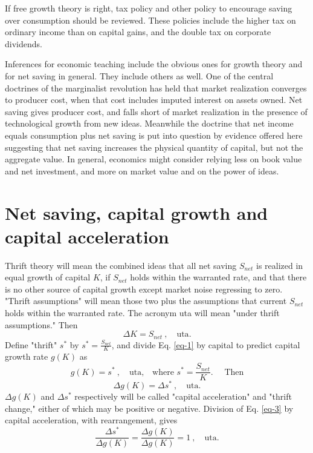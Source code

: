 \documentclass[a4paper,fleqn]{latex_styles/cas-sc}
\begin{document}
If free growth theory is right, tax policy and other policy to encourage
saving over consumption should be reviewed. These policies
include the higher tax on ordinary income than on capital gains, and the
double tax on corporate dividends.

Inferences for economic teaching include the obvious ones for growth
theory and for net saving in general. They include others as well.
One of the central doctrines of the marginalist revolution has held that
market realization converges to producer cost, when that cost includes
imputed interest on assets owned. Net saving gives producer cost,
and falls short of market realization in the presence of technological
growth from new ideas. Meanwhile the doctrine that net income equals
consumption plus net saving is put into question by evidence offered
here suggesting that net saving increases the physical quantity of
capital, but not the aggregate value. In general, economics might
consider relying less on book value and net investment, and more on market value and on the
power of ideas.

\hypertarget{net-saving-and-capital-growth}{%
\section{Net saving, capital growth and capital acceleration}\label{net-saving-and-capital-growth}}

Thrift theory will mean the combined ideas that all net saving \(S_{net}\) is realized in equal growth of capital \(K\), if \(S_{net}\) holds within the warranted rate, and that there is no other source of capital growth except market noise regressing to zero. "Thrift assumptions" will mean those two plus the assumptions that current \(S_{net}\) holds within the warranted rate. The acronym uta will mean "under thrift assumptions." Then 
%
\begin{equation}
    \Delta K = S_{net}\ ,\quad \text{uta}. \label{eq-1}
\end{equation}
%
Define "thrift" \(s^*\) by \(s^* = \frac{S_{net}}{K}\), and divide Eq. \eqref{eq-1} by capital to predict capital growth rate \(g(K)\) as
%
\begin{equation}
g(K) = s^* \ , \quad \text{uta,}\quad \text{where } s^* = \frac{S_{net}}{K}.\quad \text{ Then} \label{eq-2}
\end{equation}
%
\vspace{-5ex}
%
\begin{equation}
\Delta g(K) = \Delta s^*\ , \quad \text{uta.} \label{eq-3}
\end{equation}
%
\(\Delta g(K)\) and \(\Delta s^*\) respectively will be called "capital acceleration" and "thrift change," either of which may be positive or negative. Division of Eq. \eqref{eq-3} by capital acceleration, with rearrangement, gives
%
\begin{equation}
\frac{\Delta s^*}{\Delta g(K)} = \frac{\Delta g(K)}{\Delta g(K)} = 1\ , \quad \text{uta}. \label{eq-4}
\end{equation}
%
\end{document}
